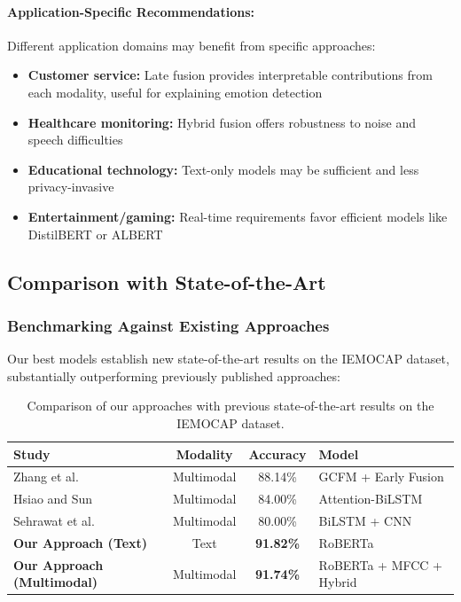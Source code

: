 \documentclass[12pt]{article}
\begin{document}
\paragraph{Application-Specific Recommendations:}
Different application domains may benefit from specific approaches:

\begin{itemize}
    \item \textbf{Customer service:} Late fusion provides interpretable contributions from each modality, useful for explaining emotion detection
    
    \item \textbf{Healthcare monitoring:} Hybrid fusion offers robustness to noise and speech difficulties
    
    \item \textbf{Educational technology:} Text-only models may be sufficient and less privacy-invasive
    
    \item \textbf{Entertainment/gaming:} Real-time requirements favor efficient models like DistilBERT or ALBERT
\end{itemize}

\subsection{Comparison with State-of-the-Art}
\subsubsection{Benchmarking Against Existing Approaches}
Our best models establish new state-of-the-art results on the IEMOCAP dataset, substantially outperforming previously published approaches:

\begin{table}[h]
\centering
\begin{tabular}{|l|c|c|l|}
\hline
\textbf{Study} & \textbf{Modality} & \textbf{Accuracy} & \textbf{Model} \\
\hline
Zhang et al.~\cite{zhang2022fine} & Multimodal & 88.14\% & GCFM + Early Fusion \\
\hline
Hsiao and Sun~\cite{hsiao2022attention} & Multimodal & 84.00\% & Attention-BiLSTM \\
\hline
Sehrawat et al.~\cite{sehrawat2023deception} & Multimodal & 80.00\% & BiLSTM + CNN \\
\hline
\textbf{Our Approach (Text)} & Text & \textbf{91.82\%} & RoBERTa \\
\hline
\textbf{Our Approach (Multimodal)} & Multimodal & \textbf{91.74\%} & RoBERTa + MFCC + Hybrid \\
\hline
\end{tabular}
\caption{Comparison of our approaches with previous state-of-the-art results on the IEMOCAP dataset.}
\label{tab:sota_comparison}
\end{table}
\end{document}
